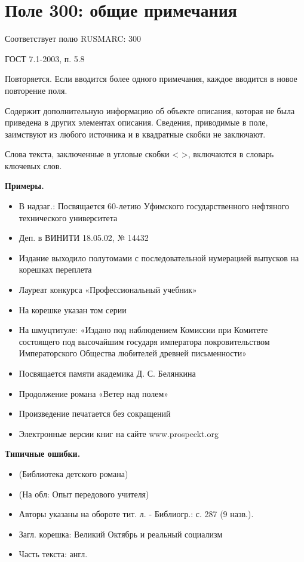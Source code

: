 \chapter{Поле 300: общие примечания}

Соответствует полю RUSMARC: 300

ГОСТ 7.1-2003, п. 5.8

Повторяется. Если вводится более одного примечания, каждое вводится в новое повторение поля.

Содержит дополнительную информацию об объекте описания, которая не была приведена в других элементах описания. Сведения, приводимые в поле, заимствуют из любого источника и в квадратные скобки не заключают.

Слова текста, заключенные в угловые скобки < >,  включаются в словарь ключевых слов.

\textbf{Примеры.}

\begin{itemize}
	\item В надзаг.: Посвящается 60-летию Уфимского государственного нефтяного технического университета
	\item Деп. в ВИНИТИ 18.05.02, № 14432
	\item Издание выходило полутомами с последовательной нумерацией выпусков на корешках переплета
	\item Лауреат конкурса «Профессиональный учебник»
	\item На корешке указан том серии
	\item На шмуцтитуле: «Издано под наблюдением Комиссии при Комитете состоящего под высочайшим государя императора покровительством Императорского Общества любителей древней письменности»
	\item Посвящается памяти академика Д. С. Белянкина
	\item Продолжение романа «Ветер над полем»
	\item Произведение печатается без сокращений
	\item Электронные версии книг на сайте www.prospeckt.org
\end{itemize}

\textbf{Типичные ошибки.}

\begin{itemize}
	\item (Библиотека детского романа)
	\item (На обл: Опыт передового учителя)
	\item Авторы указаны на обороте тит. л. - Библиогр.: с. 287 (9 назв.).
	\item Загл. корешка: Великий Октябрь и реальный социализм
	\item Часть текста: англ.
\end{itemize}

